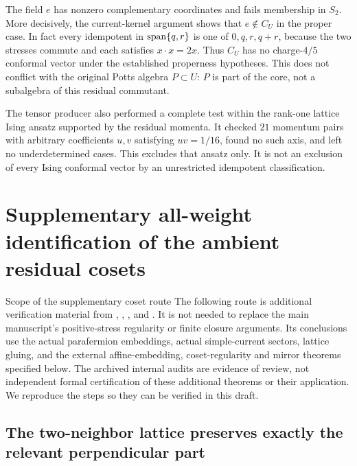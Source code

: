 The field $e$ has nonzero complementary coordinates and fails
membership in $S_2$. More decisively, the current-kernel argument
shows that $e\notin C_U$ in the proper case. In fact every
idempotent in $\operatorname{span}\{q,r\}$ is one of $0,q,r,q+r$, because the
two stresses commute and each satisfies $x\cdot x=2x$. Thus
$C_U$ has no charge-$4/5$ conformal vector under the established
properness hypotheses. This does not conflict with the original
Potts algebra $P\subset U$: $P$ is part of the core, not a
subalgebra of this residual commutant.

The tensor producer also performed a complete test within the
rank-one lattice Ising ansatz supported by the residual momenta.
It checked $21$ momentum pairs with arbitrary coefficients
$u,v$ satisfying $uv=1/16$, found no such axis, and left no
underdetermined cases. This excludes that ansatz only. It is not
an exclusion of every Ising conformal vector by an unrestricted
idempotent classification.

\section{Supplementary all-weight identification of the ambient residual cosets}
\label{expstructure:neighbor}

\begin{reviewnote}{Scope of the supplementary coset route}
The following route is additional verification material from
,
,
,
and .
It is not needed to replace the main manuscript's positive-stress
regularity or finite closure arguments. Its conclusions use the
actual parafermion embeddings, actual simple-current sectors,
lattice gluing, and the external affine-embedding, coset-regularity
and mirror theorems specified below. The archived internal audits
are evidence of review, not independent formal certification of
these additional theorems or their application. We reproduce the
steps so they can be verified in this draft.
\end{reviewnote}

\subsection{The two-neighbor lattice preserves exactly the relevant perpendicular part}

